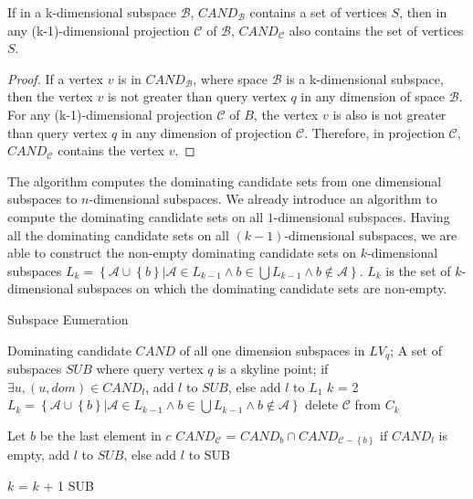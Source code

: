 \begin{property}
If in a k-dimensional subspace $\mathcal{B}$, $\mathit{CAND}_\mathcal{B}$ contains a set of vertices $S$, then in any (k-1)-dimensional projection $\mathcal{C}$ of $\mathcal{B}$, $\mathit{CAND}_\mathcal{C}$ also contains the set of vertices $S$.
\end{property}

\begin{proof}
If a vertex $v$ is in $\mathit{CAND}_\mathcal{B}$, where space $\mathcal{B}$ is a k-dimensional subspace, then the vertex $v$ is not greater than query vertex $q$ in any dimension of space $\mathcal{B}$. For any (k-1)-dimensional projection $\mathcal{C}$ of $B$, the vertex $v$ is also is not greater than query vertex $q$ in any dimension of projection $\mathcal{C}$. Therefore, in projection $\mathcal{C}$, $\mathit{CAND}_\mathcal{C}$ contains the vertex $v$.
\end{proof}

The algorithm computes the dominating candidate sets from one dimensional subspaces to $n$-dimensional subspaces. We already introduce an algorithm to compute the dominating candidate sets on all $1$-dimensional subspaces. Having all the dominating candidate sets on all $(k-1)$-dimensional subspaces, we are able to construct the non-empty dominating candidate sets on $k$-dimensional subspaces $L_k = \left\{\mathcal{A} \cup \left\{b\right\} | \mathcal{A} \in L_{k-1} \wedge b \in \bigcup L_{k-1} \wedge b \notin \mathcal{A} \right\}$. $L_k$ is the set of $k$-dimensional subspaces on which the dominating candidate sets are non-empty.

\begin{algorithm}[H]
  \caption{Subspace Eumeration}\label{algo:blah}
    \begin{algorithmic}[1]
  \show\LOOP
    \REQUIRE Dominating candidate $\mathit{CAND}$ of all one dimension subspaces in $LV_q$;
    \ENSURE A set of subspaces $SUB$ where query vertex $q$ is a skyline point;
            \STATE if $\exists u, (u, dom)\in \mathit{CAND}_l$, add $l$ to $SUB$, else add $l$ to $L_1$
        \ENDFOR
        \STATE $k$ = 2
            \STATE $L_k = \left\{\mathcal{A} \cup \left\{b\right\} | \mathcal{A} \in L_{k-1} \wedge b \in \bigcup L_{k-1} \wedge b \notin \mathcal{A} \right\}$
                        \STATE delete $\mathcal{C}$ from $C_k$
                    \ENDIF
                \ENDFOR
            \ENDFOR
            
                \STATE Let $b$ be the last element in $c$
                \STATE $CAND_\mathcal{C}$ = $CAND_b \cap CAND_{\mathcal{C}-\left\{b\right\}}$
                \STATE if $CAND_l$ is empty, add $l$ to $SUB$, else add $l$ to SUB
            \ENDFOR
            
            \STATE $k$ = $k$ + 1
        \ENDWHILE
        \RETURN SUB
  \end{algorithmic}
\end{algorithm}

